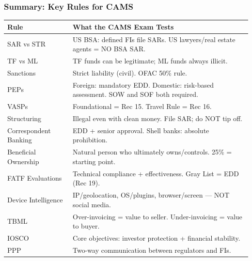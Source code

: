 \documentclass[12pt,aspectratio=169]{beamer}
\renewcommand{\scriptsize}{\fontsize{5}{6}\selectfont}
\newcommand{\keypoint}[1]{\textcolor{deepblue}{\textbf{#1}}}
\begin{document}
	\begin{frame}
		\frametitle{\fontsize{12}{14}\selectfont \textbf{Summary: Key Rules for CAMS}}
		\vspace{0.1cm}
		\scriptsize
		\begin{longtable}{|p{}|p{}|}
			\hline
			\keypoint{Rule} & \keypoint{What the CAMS Exam Tests} \\
			\hline
			SAR vs STR & US BSA: defined FIs file SARs. US lawyers/real estate agents = NO BSA SAR. \\
			\hline
			TF vs ML & TF funds can be legitimate; ML funds always illicit. \\
			\hline
			Sanctions & Strict liability (civil). OFAC 50\% rule. \\
			\hline
			PEPs & Foreign: mandatory EDD. Domestic: risk-based assessment. SOW and SOF both required. \\
			\hline
			VASPs & Foundational = Rec 15. Travel Rule = Rec 16. \\
			\hline
			Structuring & Illegal even with clean money. File SAR; do NOT tip off. \\
			\hline
			Correspondent Banking & EDD + senior approval. Shell banks: absolute prohibition. \\
			\hline
			Beneficial Ownership & Natural person who ultimately owns/controls. 25\% = starting point. \\
			\hline
			FATF Evaluations & Technical compliance + effectiveness. Gray List = EDD (Rec 19). \\
			\hline
			Device Intelligence & IP/geolocation, OS/plugins, browser/screen — NOT social media. \\
			\hline
			TBML & Over-invoicing = value to seller. Under-invoicing = value to buyer. \\
			\hline
			IOSCO & Core objectives: investor protection + financial stability. \\
			\hline
			PPP & Two-way communication between regulators and FIs. \\
			\hline
		\end{longtable}
	\end{frame}
	
\end{document}
